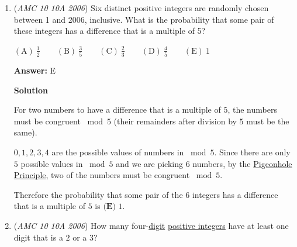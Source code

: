 \begin{enumerate}
 



\textbf{Solution 2 (Stars and Bars)}

Let the first angle be $x$, and the common difference be $d$. The arithmetic progression can now be expressed as $x + (x + d) + (x + 2d) = 180$. Simplifiying, $x + d = 60$. Now, using stars and bars, we have $\binom{61}{1} = 61$. However, we must subtract the two cases in which either $x$ or $d$ equal $0$, so we have $61 - 2$ = $\boxed{\textbf{(C) }59}$.

 



\textbf{Solution 3 (Quick Summation)}

Consider that we have $(a+n)+(a+n+1)+(a+n+2)=180 \Longleftrightarrow 3a+3(n+1)=180 \Longleftrightarrow a=59-n$, where $n \geq 0$ and $n$ is an integer. Since $a \neq 0$, $n=0,1,2,3,\cdots, 58$ which is $\boxed{\textbf{(C) }59}$ solutions.

 


	\item (\textit{AMC 10 10A 2006}) Six distinct positive integers are randomly chosen between 1 and 2006, inclusive. What is the probability that some pair of these integers has a difference that is a multiple of 5? 


 $\mathrm{(A)}\ \frac{1}{2}\qquad\mathrm{(B)}\ \frac{3}{5}\qquad\mathrm{(C)}\ \frac{2}{3}\qquad\mathrm{(D)}\ \frac{4}{5}\qquad\mathrm{(E)}\ 1$

 \textbf{Answer: }E



\textbf{Solution}

For two numbers to have a difference that is a multiple of $5$, the numbers must be congruent $\bmod{5}$ (their remainders after division by $5$ must be the same).

 $0, 1, 2, 3, 4$ are the possible values of numbers in $\bmod{5}$. Since there are only $5$ possible values in $\bmod{5}$ and we are picking $6$ numbers, by the \href{https://artofproblemsolving.com/wiki/index.php?title=Pigeonhole\_Principle}{Pigeonhole Principle}, two of the numbers must be congruent $\bmod{5}$. 

 Therefore the probability that some pair of the $6$ integers has a difference that is a multiple of $5$ is $\boxed{\textbf{(E) }1}$.

 


	\item (\textit{AMC 10 10A 2006}) How many four-\href{https://artofproblemsolving.com/wiki/index.php?title=Digit}{digit} \href{https://artofproblemsolving.com/wiki/index.php?title=Positive\_integer}{positive integers} have at least one digit that is a $2$ or a $3$?



\end{enumerate}
